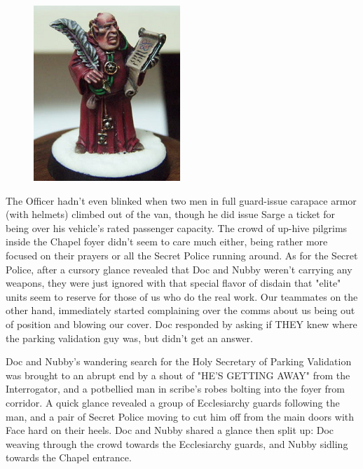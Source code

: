 \begin{figure}
	\begin{center}
		\includegraphics[width=\figwidth]{pics/17/46.png}
	\end{center}
\end{figure}
The Officer hadn't even blinked when two men in full guard-issue carapace armor (with helmets) climbed out of the van, though he did issue Sarge a ticket for being over his vehicle's rated passenger capacity. 
The crowd of up-hive pilgrims inside the Chapel foyer didn't seem to care much either, being rather more focused on their prayers or all the Secret Police running around. 
As for the Secret Police, after a cursory glance revealed that Doc and Nubby weren't carrying any weapons, they were just ignored with that special flavor of disdain that "elite" units seem to reserve for those of us who do the real work. 
Our teammates on the other hand, immediately started complaining over the comms about us being out of position and blowing our cover. 
Doc responded by asking if THEY knew where the parking validation guy was, but didn't get an answer.

Doc and Nubby's wandering search for the Holy Secretary of Parking Validation was brought to an abrupt end by a shout of "HE'S GETTING AWAY" from the Interrogator, and a potbellied man in scribe's robes bolting into the foyer from corridor. 
A quick glance revealed a group of Ecclesiarchy guards following the man, and a pair of Secret Police moving to cut him off from the main doors with Face hard on their heels. 
Doc and Nubby shared a glance then split up: 
Doc weaving through the crowd towards the Ecclesiarchy guards, and Nubby sidling towards the Chapel entrance.

